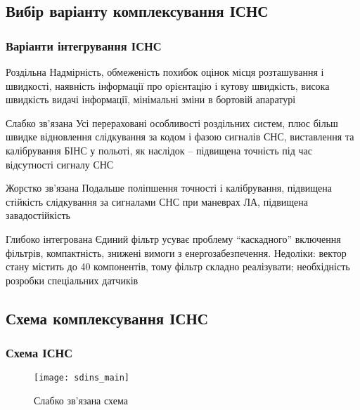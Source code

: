 \documentclass[ucs,compress]{beamer}    %
\begin{document}
\subsection{Вибір варіанту комплексування ІСНС } 
\begin{frame}\frametitle{Варіанти інтегрування ІСНС} 

\tiny
\begin{block}{Роздільна}
Надмірність, обмеженість похибок оцінок місця розташування і швидкості, 
наявність інформації про орієнтацію і кутову швидкість, висока швидкість видачі інформації, 
мінімальні зміни в бортовій апаратурі
\end{block}

\begin{exampleblock}{Слабко зв'язана}
Усі перераховані особливості роздільних систем, плюс більш 
швидке відновлення слідкування за кодом і фазою сигналів СНС, виставлення та калібрування 
БІНС у польоті, як наслідок -- підвищена точність під час відсутності сигналу СНС
\end{exampleblock}


\begin{block}{Жорстко зв'язана}
Подальше поліпшення точності і калібрування, підвищена стійкість слідкування 
за сигналами СНС при маневрах ЛА, підвищена завадостійкість 
\end{block}

\begin{block}{Глибоко інтегрована}
Єдиний фільтр усуває проблему ``каскадного'' включення 
фільтрів, компактність, знижені вимоги з енергозабезпечення. Недоліки: вектор стану 
містить до 40 компонентів, тому фільтр складно реалізувати; необхідність розробки 
спеціальних датчиків 
\end{block}
\end{frame}


\subsection{Схема комплексування ІСНС }
\begin{frame} \frametitle{Схема ІСНС} 
\begin{figure}[here]
\centering
\texttt{[image: sdins\_main]}
\caption{Слабко зв’язана схема}
\end{figure}
\end{frame}
\end{document}
